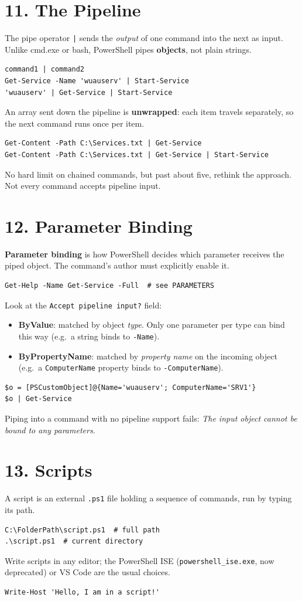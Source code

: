 \section{11. The Pipeline}
The pipe operator \texttt{|} sends the \emph{output} of one command into the next as input. Unlike cmd.exe or bash, PowerShell pipes \textbf{objects}, not plain strings.
\begin{verbatim}
command1 | command2
Get-Service -Name 'wuauserv' | Start-Service
'wuauserv' | Get-Service | Start-Service
\end{verbatim}
An array sent down the pipeline is \textbf{unwrapped}: each item travels separately, so the next command runs once per item.
\begin{verbatim}
Get-Content -Path C:\Services.txt | Get-Service
Get-Content -Path C:\Services.txt | Get-Service | Start-Service
\end{verbatim}
No hard limit on chained commands, but past about five, rethink the approach. Not every command accepts pipeline input.

\section{12. Parameter Binding}
\textbf{Parameter binding} is how PowerShell decides which parameter receives the piped object. The command's author must explicitly enable it.
\begin{verbatim}
Get-Help -Name Get-Service -Full  # see PARAMETERS
\end{verbatim}
Look at the \texttt{Accept pipeline input?} field:
\begin{itemize}
\item \textbf{ByValue}: matched by object \emph{type}. Only one parameter per type can bind this way (e.g.\ a string binds to \texttt{-Name}).
\item \textbf{ByPropertyName}: matched by \emph{property name} on the incoming object (e.g.\ a \texttt{ComputerName} property binds to \texttt{-ComputerName}).
\end{itemize}
\begin{verbatim}
$o = [PSCustomObject]@{Name='wuauserv'; ComputerName='SRV1'}
$o | Get-Service
\end{verbatim}
Piping into a command with no pipeline support fails: \emph{The input object cannot be bound to any parameters}.

\section{13. Scripts}
A script is an external \texttt{.ps1} file holding a sequence of commands, run by typing its path.
\begin{verbatim}
C:\FolderPath\script.ps1  # full path
.\script.ps1  # current directory
\end{verbatim}
Write scripts in any editor; the PowerShell ISE (\texttt{powershell\_ise.exe}, now deprecated) or VS Code are the usual choices.
\begin{verbatim}
Write-Host 'Hello, I am in a script!'
\end{verbatim}

